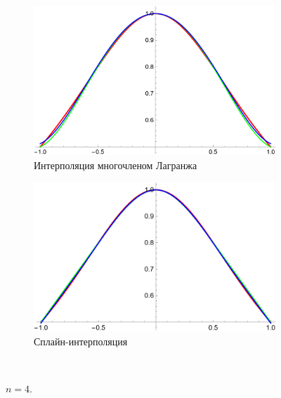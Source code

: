 \documentclass[12pt, a4paper]{article}
\begin{document}
	\begin{figure}[H]
		\centering
		\begin{subfigure}{0.4\textwidth}
			\includegraphics[width=\textwidth]{2_l4}
			\caption{Интерполяция многочленом Лагранжа}
		\end{subfigure}
		\hfill
		\begin{subfigure}{0.4\textwidth}
			\includegraphics[width=\textwidth]{2_s4}
			\caption{Сплайн-интерполяция}
		\end{subfigure}
		\hfill
		\\[0.5cm]
		\caption{$n = 4$.}
	\end{figure}
	
\end{document}
